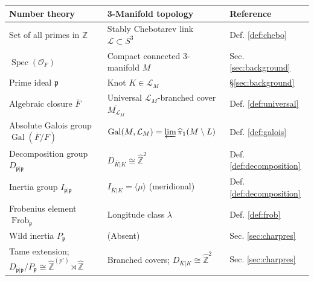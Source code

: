 \documentclass{amsart}
\theoremstyle{plain}
\theoremstyle{definition}
\theoremstyle{plain}
\theoremstyle{plain}
\theoremstyle{plain}
\theoremstyle{remark}
\theoremstyle{remark}
\theoremstyle{plain}
\theoremstyle{definition}
\theoremstyle{plain}
\theoremstyle{plain}
\theoremstyle{plain}
\numberwithin{equation}{section}
\begin{document}
{\centering \small
\renewcommand{\arraystretch}{1}
\begin{longtable}{@{} l l l @{}}

\toprule
\textbf{Number theory} & \textbf{3-Manifold topology} & \textbf{Reference} \\
\midrule
Set of all primes in $\mathbb{Z}$ & Stably Chebotarev link $\mathcal{L} \subset S^3$ & Def. \ref{def:chebo}\\
$\operatorname{Spec}(\mathcal{O}_F)$ & Compact connected 3-manifold $M$ & Sec. \ref{sec:background} \\
Prime ideal $\mathfrak{p}$ & Knot $K \in \mathcal{L}_M$ & \S\ref{sec:background} \\
Algebraic closure $\overline{F}$ & Universal $\mathcal{L}_M$-branched cover $\overline{M_{\mathcal{L}_M}}$ & Def. \ref{def:universal} \\
Absolute Galois group $\operatorname{Gal}(\overline{F}/F)$ & $\operatorname{Gal}(M, \mathcal{L}_M) = \varprojlim \widehat{\pi}_1(M \setminus L)$ & Def. \ref{def:galois} \\
Decomposition group $D_{\overline{\mathfrak{p}}|\mathfrak{p}}$ & $D_{\overline{K}|K} \cong \widehat{\mathbb{Z}}^2$ & Def. \ref{def:decomposition} \\
Inertia group $I_{\overline{\mathfrak{p}}|\mathfrak{p}}$ & $I_{\overline{K}|K} = \langle \mu \rangle$ (meridional) & Def. \ref{def:decomposition} \\
Frobenius element $\operatorname{Frob}_{\mathfrak{p}}$ & Longitude class $\lambda$ & Def. \ref{def:frob} \\
Wild inertia $P_{\mathfrak{p}}$ & (Absent) & Sec. \ref{sec:charpres} \\
Tame extension; $D_{\overline{\mathfrak{p}}|\mathfrak{p}}/P_{\mathfrak{p}}\cong \widehat{\mathbb{Z}}^{(p')}\rtimes \widehat{\mathbb{Z}}$ & Branched covers; $D_{\overline{K}|K} \cong \widehat{\mathbb{Z}}^2$ & Sec. \ref{sec:charpres} \\


\end{longtable}}
\end{document}
